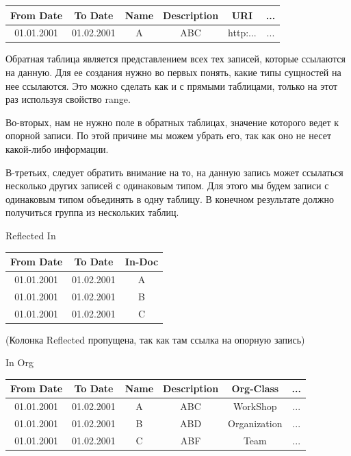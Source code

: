 \documentclass[12pt]{article}
\begin{document}
\begin{center}
    \begin{tabular}{ | c | c | c | c | c | c | }
        \hline
        From Date  & To Date    & Name & Description & URI      & ... \\
        \hline
        01.01.2001 & 01.02.2001 & A    & ABC         & http:... & ... \\
        \hline
    \end{tabular}
\end{center}

Обратная таблица является представлением всех тех записей, которые ссылаются на данную. Для ее создания нужно во первых понять, какие типы сущностей на нее ссылаются. Это можно сделать как и с прямыми таблицами, только на этот раз используя свойство range.

Во-вторых, нам не нужно поле в обратных таблицах, значение которого ведет к опорной записи. По этой причине мы можем убрать его, так как оно не несет какой-либо информации.

В-третьих, следует обратить внимание на то, на данную запись может ссылаться несколько других записей с одинаковым типом. Для этого мы будем записи с одинаковым типом объединять в одну таблицу. В конечном результате должно получиться группа из нескольких таблиц.

Reflected In
\begin{tabular}{ | c | c | c | }
    \hline
    From Date  & To Date    & In-Doc \\
    \hline
    01.01.2001 & 01.02.2001 & A      \\
    \hline
    01.01.2001 & 01.02.2001 & B      \\
    \hline
    01.01.2001 & 01.02.2001 & C      \\
    \hline
\end{tabular}

(Колонка Reflected пропущена, так как там ссылка на опорную запись)

In Org
\begin{tabular}{ | c | c | c | c | c | c | }
    \hline
    From Date  & To Date    & Name & Description & Org-Class    & ... \\
    \hline
    01.01.2001 & 01.02.2001 & A    & ABC         & WorkShop     & ... \\
    \hline
    01.01.2001 & 01.02.2001 & B    & ABD         & Organization & ... \\
    \hline
    01.01.2001 & 01.02.2001 & C    & ABF         & Team         & ... \\
    \hline
\end{tabular}
\end{document}
